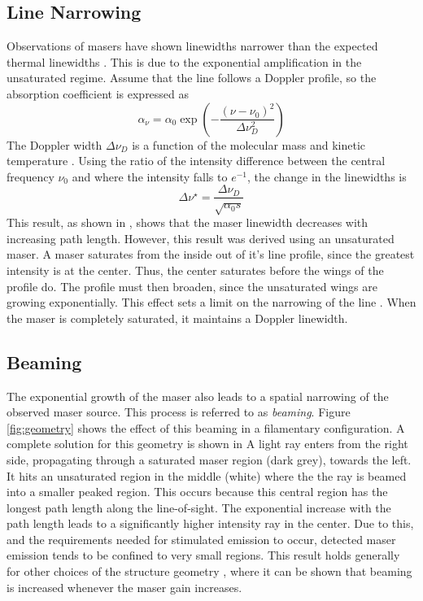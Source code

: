 \subsection{Line Narrowing}
\label{sub:line_narrow}

Observations of masers have shown linewidths narrower than the expected thermal linewidths \citep[][e.g.,]{Elitzur_1992,stahler_palla_2004}. This is due to the exponential amplification in the unsaturated regime. Assume that the line follows a Doppler profile, so the absorption coefficient is expressed as
\begin{equation}
\label{eq:doppler_profile}
\alpha_\nu = \alpha_0 \exp\left( -\frac{(\nu - \nu_0)^2}{\Delta\nu_D^2} \right)
\end{equation}
The Doppler width $\Delta\nu_D$ is a function of the molecular mass and kinetic temperature \citep{stahler_palla_2004}. Using the ratio of the intensity difference between the central frequency $\nu_0$ and where the intensity falls to $e^{-1}$, the change in the linewidths is
\begin{equation}
\label{eq:line_narrow}
\Delta\nu^\star = \frac{\Delta\nu_D}{\sqrt{\alpha_0 s}}
\end{equation}
This result, as shown in \citet{stahler_palla_2004}, shows that the maser linewidth decreases with increasing path length. However, this result was derived using an unsaturated maser. A maser saturates from the inside out of it's line profile, since the greatest intensity is at the center. Thus, the center saturates before the wings of the profile do. The profile must then broaden, since the unsaturated wings are growing exponentially. This effect sets a limit on the narrowing of the line \citep{Elitzur_1992,stahler_palla_2004}. When the maser is completely saturated, it maintains a Doppler linewidth. 

\subsection{Beaming}
\label{sub:beaming}

The exponential growth of the maser also leads to a spatial narrowing of the observed maser source. This process is referred to as {\it beaming}. Figure \ref{fig:geometry} shows the effect of this beaming in a filamentary configuration. A complete solution for this geometry is shown in \citet{Elitzur_1991} A light ray enters from the right side, propagating through a saturated maser region (dark grey), towards the left. It hits an unsaturated region in the middle (white) where the the ray is beamed into a smaller peaked region. This occurs because this central region has the longest path length along the line-of-sight. The exponential increase with the path length leads to a significantly higher intensity ray in the center. Due to this, and the requirements needed for stimulated emission to occur, detected maser emission tends to be confined to very small regions. This result holds generally for other choices of the structure geometry \citep{Elitzur_1990_paperII}, where it can be shown that beaming is increased whenever the maser gain increases.

